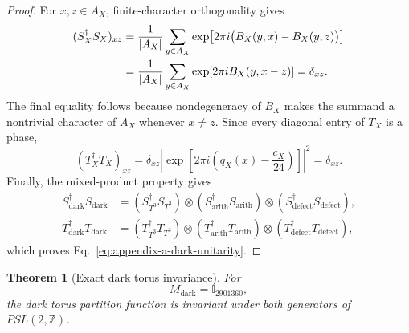 \documentclass[11pt,letterpaper]{article}
\theoremstyle{plain}
\newtheorem{theorem}{Theorem}
\begin{document}
\begin{proof}
For $x,z\in A_X$, finite-character orthogonality gives
\begin{align}
\label{eq:appendix-a-weil-orthogonality}
 (S_X^\dagger S_X)_{xz}
 &=
 \frac{1}{|A_X|}
 \sum_{y\in A_X}
 \exp\!\left[
 2\pi i\bigl(B_X(y,x)-B_X(y,z)\bigr)
 \right]
 \notag\\
 &=
 \frac{1}{|A_X|}
 \sum_{y\in A_X}
 \exp\!\left[2\pi iB_X(y,x-z)\right]
 =
 \delta_{xz}.
\end{align}
The final equality follows because nondegeneracy of $B_X$ makes the summand a
nontrivial character of $A_X$ whenever $x\ne z$.  Since every diagonal entry of
$T_X$ is a phase,
\begin{equation}
\label{eq:appendix-a-t-unitarity}
 (T_X^\dagger T_X)_{xz}
 =
 \delta_{xz}
 \left|
 \exp\!\left[
 2\pi i\left(q_X(x)-\frac{c_X}{24}\right)
 \right]
 \right|^2
 =
 \delta_{xz}.
\end{equation}
Finally, the mixed-product property gives
\begin{align}
\label{eq:appendix-a-kronecker-unitarity}
 S_{\text{dark}}^\dagger S_{\text{dark}}
 &=
 (S_{T^3}^\dagger S_{T^3})
 \otimes
 (S_{\text{arith}}^\dagger S_{\text{arith}})
 \otimes
 (S_{\text{defect}}^\dagger S_{\text{defect}}),
 \\
 T_{\text{dark}}^\dagger T_{\text{dark}}
 &=
 (T_{T^3}^\dagger T_{T^3})
 \otimes
 (T_{\text{arith}}^\dagger T_{\text{arith}})
 \otimes
 (T_{\text{defect}}^\dagger T_{\text{defect}}),
\end{align}
which proves Eq.~\eqref{eq:appendix-a-dark-unitarity}.
\end{proof}

\begin{theorem}[Exact dark torus invariance]
For
\begin{equation}
\label{eq:appendix-a-dark-identity-pairing}
 M_{\text{dark}}=\mathbb I_{2901360},
\end{equation}
the dark torus partition function is invariant under both generators of
$PSL(2,\mathbb Z)$.
\end{theorem}
\end{document}
